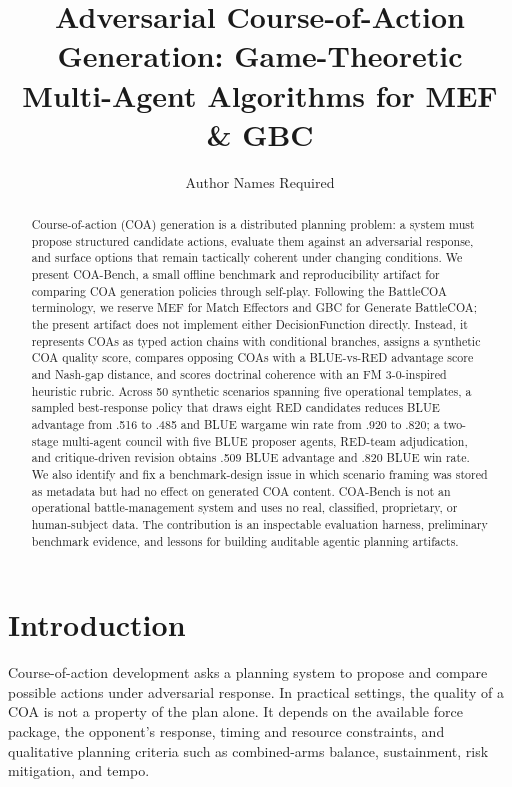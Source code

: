 \documentclass[sigconf]{acmart}
\title{Adversarial Course-of-Action Generation: Game-Theoretic Multi-Agent Algorithms for MEF \& GBC}
\author{Author Names Required}
\affiliation{%
  \institution{Organization Required}
  \city{City Required}
  \country{Country Required}}
\begin{document}
\begin{abstract}
Course-of-action (COA) generation is a distributed planning problem: a system must propose structured candidate actions, evaluate them against an adversarial response, and surface options that remain tactically coherent under changing conditions. We present COA-Bench, a small offline benchmark and reproducibility artifact for comparing COA generation policies through self-play. Following the BattleCOA terminology, we reserve MEF for Match Effectors and GBC for Generate BattleCOA; the present artifact does not implement either DecisionFunction directly. Instead, it represents COAs as typed action chains with conditional branches, assigns a synthetic COA quality score, compares opposing COAs with a BLUE-vs-RED advantage score and Nash-gap distance, and scores doctrinal coherence with an FM 3-0-inspired heuristic rubric. Across 50 synthetic scenarios spanning five operational templates, a sampled best-response policy that draws eight RED candidates reduces BLUE advantage from .516 to .485 and BLUE wargame win rate from .920 to .820; a two-stage multi-agent council with five BLUE proposer agents, RED-team adjudication, and critique-driven revision obtains .509 BLUE advantage and .820 BLUE win rate. We also identify and fix a benchmark-design issue in which scenario framing was stored as metadata but had no effect on generated COA content. COA-Bench is not an operational battle-management system and uses no real, classified, proprietary, or human-subject data. The contribution is an inspectable evaluation harness, preliminary benchmark evidence, and lessons for building auditable agentic planning artifacts.
\end{abstract}



\maketitle

\section{Introduction}

Course-of-action development asks a planning system to propose and compare possible actions under adversarial response. In practical settings, the quality of a COA is not a property of the plan alone. It depends on the available force package, the opponent's response, timing and resource constraints, and qualitative planning criteria such as combined-arms balance, sustainment, risk mitigation, and tempo.
\end{document}

